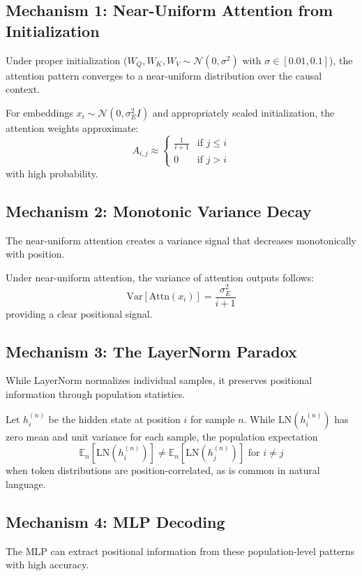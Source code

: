 \documentclass[11pt]{article}
\begin{document}
\subsection{Mechanism 1: Near-Uniform Attention from Initialization}
Under proper initialization ($W_Q, W_K, W_V \sim \mathcal{N}(0, \sigma^2)$ with $\sigma \in [0.01, 0.1]$), the attention pattern converges to a near-uniform distribution over the causal context.

\begin{lemma}
For embeddings $x_i \sim \mathcal{N}(0, \sigma_E^2 I)$ and appropriately scaled initialization, the attention weights approximate:
\[
A_{i,j} \approx \begin{cases}
\frac{1}{i+1} & \text{if } j \leq i \\
0 & \text{if } j > i
\end{cases}
\]
with high probability.
\end{lemma}

\subsection{Mechanism 2: Monotonic Variance Decay}
The near-uniform attention creates a variance signal that decreases monotonically with position.

\begin{lemma}
Under near-uniform attention, the variance of attention outputs follows:
\[
\text{Var}[\text{Attn}(x_i)] = \frac{\sigma_E^2}{i+1}
\]
providing a clear positional signal.
\end{lemma}

\subsection{Mechanism 3: The LayerNorm Paradox}
While LayerNorm normalizes individual samples, it preserves positional information through population statistics.

\begin{theorem}
Let $h_i^{(n)}$ be the hidden state at position $i$ for sample $n$. While $\text{LN}(h_i^{(n)})$ has zero mean and unit variance for each sample, the population expectation
\[
\mathbb{E}_n[\text{LN}(h_i^{(n)})] \neq \mathbb{E}_n[\text{LN}(h_j^{(n)})] \text{ for } i \neq j
\]
when token distributions are position-correlated, as is common in natural language.
\end{theorem}

\subsection{Mechanism 4: MLP Decoding}
The MLP can extract positional information from these population-level patterns with high accuracy.
\end{document}
